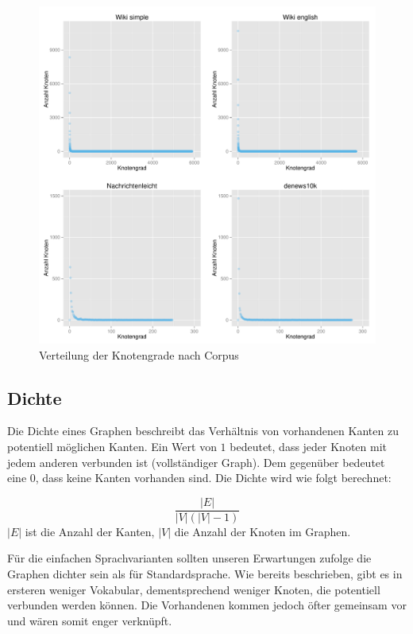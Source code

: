\documentclass[11pt, a4paper]{article}
\begin{document}
\begin{figure}[ht]
    \centering
        \includegraphics[scale=.5]{vdeg_plots.pdf}
    \caption{Verteilung der Knotengrade nach Corpus}
    \label{fig-vdeg}
\end{figure}


\subsection{Dichte}

Die Dichte eines Graphen beschreibt das Verhältnis von vorhandenen Kanten zu
potentiell möglichen Kanten.
Ein Wert von $1$ bedeutet, dass jeder Knoten mit jedem anderen verbunden ist
(vollständiger Graph).
Dem gegenüber bedeutet eine $0$, dass keine Kanten vorhanden sind.
Die Dichte wird wie folgt berechnet:

$$
    \frac{|E|}{|V|\left(|V|-1\right)}
$$
$|E|$ ist die Anzahl der Kanten, $|V|$ die Anzahl der Knoten im Graphen. 

Für die einfachen Sprachvarianten sollten unseren Erwartungen zufolge die
Graphen dichter sein als für Standardsprache.
Wie bereits beschrieben, gibt es in ersteren weniger Vokabular, dementsprechend
weniger Knoten, die potentiell verbunden werden können. Die Vorhandenen kommen
jedoch öfter gemeinsam vor und wären somit enger verknüpft.
\end{document}
